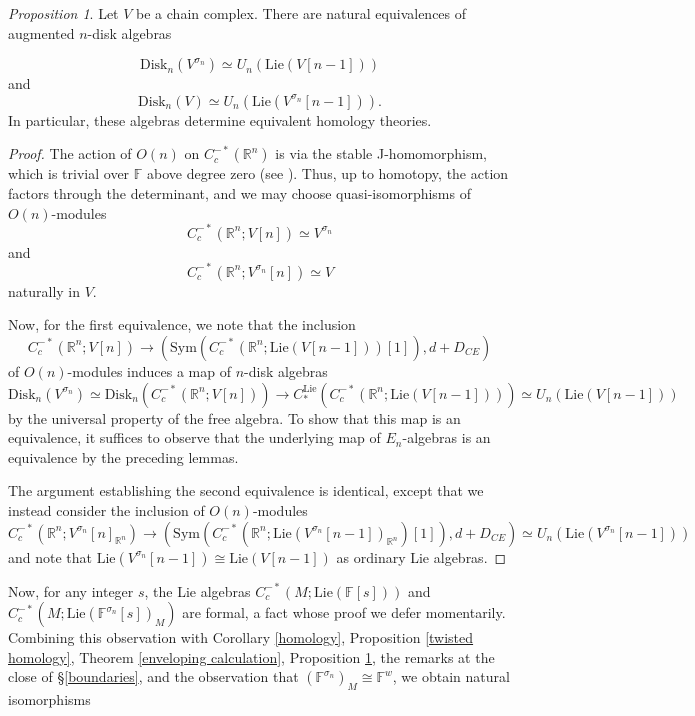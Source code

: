 \documentclass{compositio}
\theoremstyle{definition}\newtheorem{definition}{Definition}[section]
\theoremstyle{theorem}\newtheorem{lemma}[definition]{Lemma}
\theoremstyle{remark}\newtheorem*{conventions}{Conventions}
\theoremstyle{remark}\newtheorem*{acknowledgments}{Acknowledgments}
\theoremstyle{remark}\newtheorem*{outline}{Outline}
\theoremstyle{remark}\newtheorem*{questions}{Questions}
\theoremstyle{remark}\newtheorem{example}[definition]{Example}
\theoremstyle{definition}\newtheorem{construction}[definition]{Construction}
\theoremstyle{definition}\newtheorem*{convention}{Convention}
\theoremstyle{definition}\newtheorem*{conjecture}{Conjecture}
\theoremstyle{theorem}\newtheorem{theorem}[definition]{Theorem}
\theoremstyle{theorem}\newtheorem{paradigm}[definition]{Paradigm}
\theoremstyle{remark}\newtheorem{remark}[definition]{Remark}
\theoremstyle{corollary}\newtheorem{corollary}[definition]{Corollary}
\theoremstyle{theorem}\newtheorem{proposition}[definition]{Proposition}
\theoremstyle{definition}\newtheorem{question}[definition]{Question}
\begin{document}
\begin{proposition}\label{equivalence}
Let $V$ be a chain complex. There are natural equivalences of augmented $n$-disk algebras 

$${\mathrm{Disk}}_n(V^{\sigma_n})\simeq U_n({\mathrm{Lie}}(V[n-1]))$$ and $${\mathrm{Disk}}_n(V)\simeq U_n({\mathrm{Lie}}(V^{\sigma_n}[n-1])).$$  In particular, these algebras determine equivalent homology theories.
\end{proposition}
\begin{proof}
The action of $O(n)$ on $C_c^{-*}(\mathbb{R}^n)$ is via the stable J-homomorphism, which is trivial over $\mathbb{F}$ above degree zero (see \cite{Adams}). Thus, up to homotopy, the action factors through the determinant, and we may choose quasi-isomorphisms of $O(n)$-modules $$C_c^{-*}(\mathbb{R}^n;V[n])\simeq V^{\sigma_n}$$ and $$C_c^{-*}(\mathbb{R}^n; V^{\sigma_n}[n])\simeq V$$ naturally in $V$. 

Now, for the first equivalence, we note that the inclusion $$ C_c^{-*}(\mathbb{R}^n;V[n])\to ({\mathrm{Sym}}( C_c^{-*}(\mathbb{R}^n;{\mathrm{Lie}}(V[n-1]))[1]),d+D_{CE})
$$ of $O(n)$-modules induces a map of $n$-disk algebras $${\mathrm{Disk}}_n(V^{\sigma_n})\simeq {\mathrm{Disk}}_n( C_c^{-*}(\mathbb{R}^n; V[n]))\to C_*^{\mathrm{Lie}}(C_c^{-*}(\mathbb{R}^n;{\mathrm{Lie}}(V[n-1]))) \simeq U_n({\mathrm{Lie}}(V[n-1]))$$ by the universal property of the free algebra. To show that this map is an equivalence, it suffices to observe that the underlying map of $E_n$-algebras is an equivalence by the preceding lemmas.

The argument establishing the second equivalence is identical, except that we instead consider the inclusion of $O(n)$-modules $$C_c^{-*}(\mathbb{R}^n;V^{\sigma_n}[n]_{\mathbb{R}^n})\to ({\mathrm{Sym}}( C_c^{-*}(\mathbb{R}^n;{\mathrm{Lie}}(V^{\sigma_n}[n-1])_{\mathbb{R}^n})[1]),d+D_{CE})\simeq U_n({\mathrm{Lie}}(V^{\sigma_n}[n-1]))
$$ and note that ${\mathrm{Lie}}(V^{\sigma_n}[n-1])\cong {\mathrm{Lie}}(V[n-1])$ as ordinary Lie algebras.
\end{proof}

Now, for any integer $s$, the Lie algebras $C_c^{-*}(M;{\mathrm{Lie}}(\mathbb{F}[s]))$ and $C_c^{-*}(M;{\mathrm{Lie}}(\mathbb{F}^{\sigma_n}[s])_M)$ are formal, a fact whose proof we defer momentarily. Combining this observation with Corollary \ref{homology}, Proposition \ref{twisted homology}, Theorem \ref{enveloping calculation}, Proposition \ref{equivalence}, the remarks at the close of \S\ref{boundaries}, and the observation that $(\mathbb{F}^{\sigma_n})_M\cong\mathbb{F}^w$, we obtain natural isomorphisms 
\end{document}
